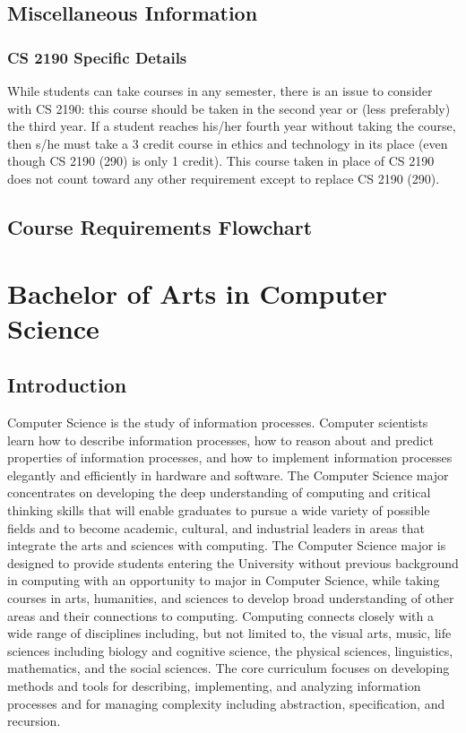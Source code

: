 \documentclass[10pt,letter]{book}
\newcommand{\mychapter}[2]{\chapter{#1}\renewcommand{\leftmark}{\textsc{#2}}}
\newcommand{\mysection}[1]{\section{#1}\renewcommand{\rightmark}{#1}}
\begin{document}
\mysection{Miscellaneous Information}
\subsection{CS 2190 Specific Details}

While students can take courses in any semester, there is an issue to
consider with CS 2190: this course should be taken in the second
year or (less preferably) the third year. If a student reaches his/her
fourth year without taking the course, then s/he must take a 3 credit
course in ethics and technology in its place (even though CS 2190
(290) is only 1 credit). This course taken in place of CS 2190
does not count toward any other requirement except to replace CS 2190
(290).



\clearpage
\mysection{Course Requirements Flowchart}

\begin{figure}[h!]
\end{figure}


\clearpage
\mychapter{Bachelor of Arts in Computer Science}{BA CS Degree}
\label{bacschapter}

\mysection{Introduction}

Computer Science is the study of information processes. Computer
scientists learn how to describe information processes, how to reason
about and predict properties of information processes, and how to
implement information processes elegantly and efficiently in hardware
and software. The Computer Science major concentrates on developing
the deep understanding of computing and critical thinking skills that
will enable graduates to pursue a wide variety of possible fields and
to become academic, cultural, and industrial leaders in areas that
integrate the arts and sciences with computing. The Computer Science
major is designed to provide students entering the University without
previous background in computing with an opportunity to major in
Computer Science, while taking courses in arts, humanities, and
sciences to develop broad understanding of other areas and their
connections to computing. Computing connects closely with a wide range
of disciplines including, but not limited to, the visual arts, music,
life sciences including biology and cognitive science, the physical
sciences, linguistics, mathematics, and the social sciences. The core
curriculum focuses on developing methods and tools for describing,
implementing, and analyzing information processes and for managing
complexity including abstraction, specification, and recursion. 
\end{document}
